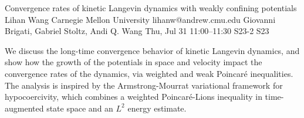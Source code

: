 \documentclass[12pt,lettersize,oneside]{book} %
\begin{document}
\begin{talk}
  {Convergence rates of kinetic Langevin dynamics with weakly confining potentials}%
  {Lihan Wang}%
  {Carnegie Mellon University}%
  {lihanw@andrew.cmu.edu}%
  {Giovanni Brigati, Gabriel Stoltz, Andi Q. Wang}%
  {}%
  {Thu, Jul 31 11:00--11:30}%
  {S23-2}%
  {S23}%
  
    
   
We discuss the long-time convergence behavior of kinetic Langevin dynamics, and show how the growth of the potentials in space and velocity impact the convergence rates of the dynamics, via weighted and weak Poincar\'e inequalities. The analysis is inspired by the Armstrong-Mourrat variational framework for hypocoercivity, which combines a weighted Poincar\'e-Lions inequality in time-augmented state space and an $L^2$ energy estimate.


\end{talk}
\end{document}
